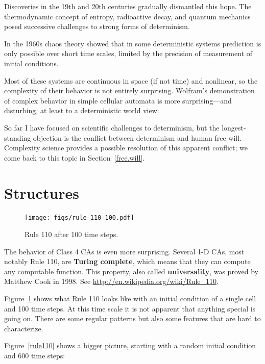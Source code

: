 \documentclass[10pt]{book}
\begin{document}
Discoveries in the 19th and 20th centuries gradually dismantled
this hope.  The thermodynamic concept of entropy, radioactive decay,
and quantum mechanics posed successive challenges to strong
forms of determinism.

In the 1960s chaos theory showed that in some deterministic systems
prediction is only possible over short time scales,  limited by
the precision of measurement of initial conditions.

Most of these systems are continuous in space (if not time) and
nonlinear, so the complexity of their behavior is not entirely
surprising.  Wolfram's demonstration of complex behavior in simple
cellular automata is more surprising---and disturbing, at least to a
deterministic world view.

So far I have focused on scientific challenges to determinism, but the
longest-standing objection is the conflict between
determinism and human free will.  Complexity science provides
a possible resolution of this apparent conflict; we come
back to this topic in Section~\ref{free.will}.


\section{Structures}

\begin{figure}
\centerline{\texttt{[image: figs/rule-110-100.pdf]}}
\caption{Rule 110 after 100 time steps.\label{fig.rule110}}
\end{figure}

The behavior of Class 4 CAs is even more surprising.  Several 1-D CAs,
most notably Rule 110, are {\bf Turing complete}, which means that
they can compute any computable function.  This property, also called
{\bf universality}, was proved by Matthew Cook in 1998.  See
\url{http://en.wikipedia.org/wiki/Rule_110}.

Figure~\ref{fig.rule110} shows what Rule 110 looks like with an initial
condition of a single cell and 100 time steps.
At this time scale it is not apparent that anything special is
going on.  There are some regular patterns but also some features
that are hard to characterize.

Figure~\ref{rule110} shows a bigger picture, starting with a random
initial condition and 600 time steps:
\end{document}
